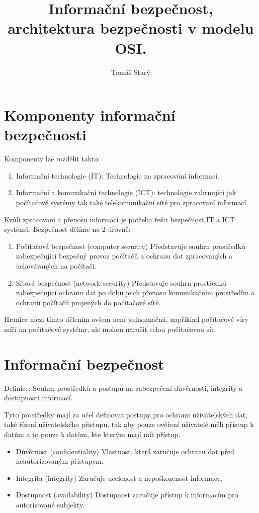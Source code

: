 \documentclass{szzclass}
\title{Informační bezpečnost, architektura bezpečnosti v modelu OSI.}
\author{Tomáš Starý}
\begin{document}
\maketitle
\tableofcontents
\newpage

\section{Komponenty informační bezpečnosti}

Komponenty lze rozdělit takto:
\begin{enumerate}
    \item Informační technologie (IT): Technologie na zpracování informací.
    \item Informační a komunikační technologie (ICT): technologie zahrnující jak počítačové systémy
    tak také telekomunikační sítě pro zpracovaní informací.
\end{enumerate}

Kvůli zpracovaní a přenosu informací je potřeba řešit bezpečnost IT a ICT systémů. Bezpečnost dělíme na 2 úrovně:
\begin{enumerate}
    \item Počítačová bezpečnost (computer security)
          Představuje souhrn prostředků zabezpečující bezpečný provoz počítačů a ochranu dat
          zpracovaných a uchovávaných na počítači.
    \item Síťová bezpečnost (network security)
          Představuje souhrn prostředků zabezpečující ochranu dat po dobu jeich přenosu komunikačním
          prostředím a ochranu počítačů projených do počítačové sítě.
\end{enumerate}

Hranice mezi tímto dělením ovšem není jednoznačná, například počítačové viry míří na počítačové systémy, ale
mohou narušit celou počítačovou síť.

\section{Informační bezpečnost}

Definice: Souhrn prostředků a postupů na zabezpečení důvěrnosti, integrity a dostupnosti informací.

Tyto prostředky mají za učel definovat postupy pro ochranu uživatelských dat, také řízení uživatelského
přistupu, tak aby pouze ověření uživatelé měli přístup k datům a to pouze k datům, kte kterým mají mít přístup.

\begin{itemize}
    \item Důvěrnost (confidentiality)
          Vlastnost, která zaručuje ochranu dat před neautorizovaným přístupem.
    \item Integrita (integrity)
          Zaručuje ucelenost a nepoškozenost informace.
    \item Dostupnost (availability)
          Dostupnost zaručuje přístup k informacím pro autorizované subjekty.
\end{itemize}
\end{document}
